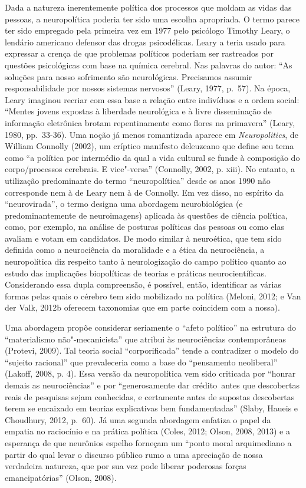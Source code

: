 Dada a natureza inerentemente política dos processos que moldam as vidas
das pessoas, a neuropolítica poderia ter sido uma escolha apropriada. O
termo parece ter sido empregado pela primeira vez em 1977 pelo psicólogo
Timothy Leary, o lendário americano defensor das drogas psicodélicas.
Leary a teria usado para expressar a crença de que problemas políticos
poderiam ser rastreados por questões psicológicas com base na química
cerebral. Nas palavras do autor: ``As soluções para nosso sofrimento são
neurológicas. Precisamos assumir responsabilidade por nossos sistemas
nervosos'' (Leary, 1977, p.~57). Na época, Leary imaginou recriar com
essa base a relação entre indivíduos e a ordem social: ``Mentes jovens
expostas à liberdade neurológica e à livre disseminação de informação
eletrônica brotam repentinamente como flores na primavera'' (Leary, 1980,
pp.~33-36). Uma noção já menos romantizada aparece em
\emph{Neuropolitics}, de William Connolly (2002), um críptico
manifesto deleuzeano que define seu tema como ``a política por
intermédio da qual a vida cultural se funde à composição do
corpo/processos cerebrais. E vice"-versa'' (Connolly, 2002, p. xiii). No
entanto, a utilização predominante do termo ``neuropolítica'' desde os
anos 1990 não corresponde nem à de Leary nem à de Connolly. Em vez
disso, no espírito da ``neurovirada'', o termo designa uma abordagem
neurobiológica (e predominantemente de neuroimagens) aplicada às
questões de ciência política, como, por exemplo, na análise de posturas
políticas das pessoas ou como elas avaliam e votam em candidatos. De modo
similar à neuroética, que tem sido definida como a neurociência da
moralidade e a ética da neurociência, a neuropolítica diz respeito tanto
à neurologização do campo político quanto ao estudo das implicações
biopolíticas de teorias e práticas neurocientíficas. Considerando essa
dupla compreensão, é possível, então, identificar as várias formas pelas
quais o cérebro tem sido mobilizado na política (Meloni, 2012; e Van der
Valk, 2012b oferecem taxonomias que em parte coincidem com a nossa).

Uma abordagem propõe considerar seriamente o ``afeto político'' na
estrutura do ``materialismo não"-mecanicista'' que atribui às
neurociências contemporâneas (Protevi, 2009). Tal teoria social
``corporificada'' tende a contradizer o modelo do ``sujeito racional''
que prevaleceria como a base do ``pensamento neoliberal'' (Lakoff, 2008,
p. 4). Essa versão da neuropolítica vem sido criticada por ``honrar
demais as neurociências'' e por ``generosamente dar crédito~antes que
descobertas reais de pesquisas sejam conhecidas, e certamente antes de
supostas descobertas terem se encaixado em teorias explicativas bem
fundamentadas'' (Slaby, Haueis e Choudhury, 2012, p.~60). Já uma segunda
abordagem enfatiza o papel da empatia no raciocínio e na prática
política (Coles, 2012; Olson, 2008, 2013) e a esperança de que neurônios
espelho forneçam um ``ponto moral arquimediano a partir do qual levar o
discurso público rumo a uma apreciação de nossa verdadeira natureza, que
por sua vez pode liberar poderosas forças emancipatórias'' (Olson,
2008).

